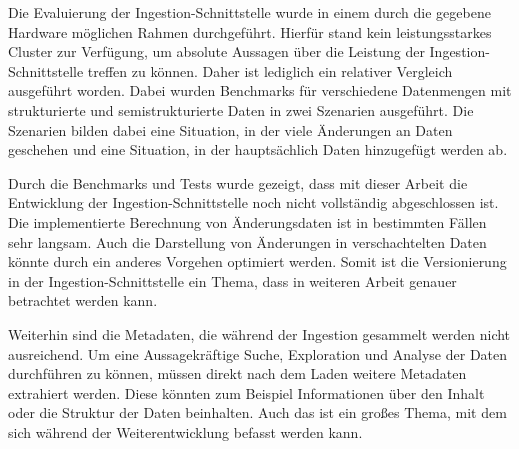 Die Evaluierung der Ingestion-Schnittstelle wurde in einem durch die gegebene Hardware möglichen Rahmen durchgeführt.
Hierfür stand kein leistungsstarkes Cluster zur Verfügung, um absolute Aussagen über die Leistung der Ingestion-Schnittstelle treffen zu können.
Daher ist lediglich ein relativer Vergleich ausgeführt worden.
Dabei wurden Benchmarks für verschiedene Datenmengen mit strukturierte und semistrukturierte Daten in zwei Szenarien ausgeführt.
Die Szenarien bilden dabei eine Situation, in der viele Änderungen an Daten geschehen und eine Situation, in der hauptsächlich Daten hinzugefügt werden ab.

Durch die Benchmarks und Tests wurde gezeigt, dass mit dieser Arbeit die Entwicklung der Ingestion-Schnittstelle noch nicht vollständig abgeschlossen ist.
Die implementierte Berechnung von Änderungsdaten ist in bestimmten Fällen sehr langsam.
Auch die Darstellung von Änderungen in verschachtelten Daten könnte durch ein anderes Vorgehen optimiert werden.
Somit ist die Versionierung in der Ingestion-Schnittstelle ein Thema, dass in weiteren Arbeit genauer betrachtet werden kann.

Weiterhin sind die Metadaten, die während der Ingestion gesammelt werden nicht ausreichend.
Um eine Aussagekräftige Suche, Exploration und Analyse der Daten durchführen zu können, müssen direkt nach dem Laden weitere Metadaten extrahiert werden.
Diese könnten zum Beispiel Informationen über den Inhalt oder die Struktur der Daten beinhalten.
Auch das ist ein großes Thema, mit dem sich während der Weiterentwicklung befasst werden kann.